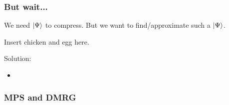 \documentclass{beamer}
\theoremstyle{definition}
\begin{document}
\begin{frame}
	\frametitle{But wait...}
	
	We need $\ket{\Psi}$ to compress. But we want to find/approximate such a $\ket{\Psi}$. \\
	
	\vspace{8pt}
	
	Insert chicken and egg here.\\
	
	\vspace{8pt}
	
	Solution:
	\begin{itemize}
		\item 
	\end{itemize}
\end{frame}


\begin{frame}
	\frametitle{MPS and DMRG}
\end{frame}
\end{document}
